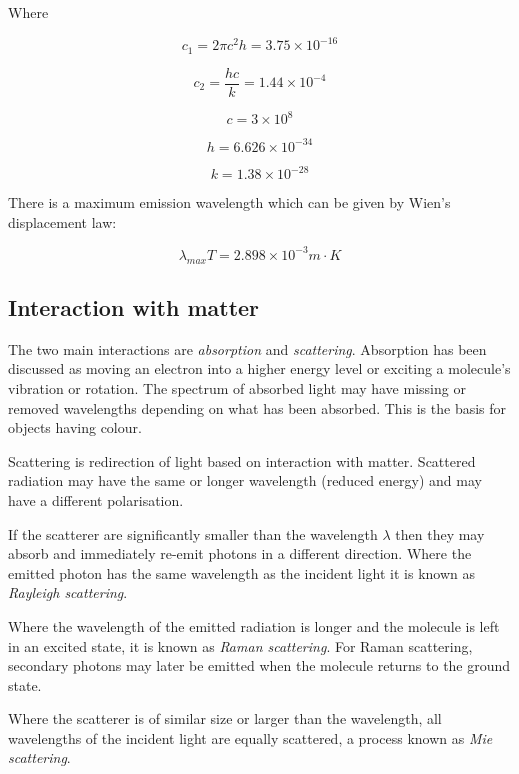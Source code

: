 Where 

\begin{equation}
c_1 = 2\pi c^2 h = 3.75\times10^{-16}
\end{equation}

\begin{equation}
c_2 = \frac{hc}{k} = 1.44\times10^{-4}
\end{equation}

\begin{equation}
c = 3\times10^8
\end{equation}

\begin{equation}
h = 6.626\times10^{-34}
\end{equation}

\begin{equation}
k = 1.38\times10^{-28}
\end{equation}

There is a maximum emission wavelength which can be given by Wien's displacement law:

\begin{equation}
	\lambda_{max}T = 2.898\times10^{-3}m\cdot K
\end{equation}	

\subsection{Interaction with matter}
The two main interactions are {\em absorption} and {\em scattering}. 
Absorption has been discussed as moving an electron into a higher energy level or exciting a molecule's vibration or rotation. The spectrum of absorbed light may have missing or removed wavelengths depending on what has been absorbed. This is the basis for objects having colour.

Scattering is redirection of light based on interaction with matter. Scattered radiation may have the same or longer wavelength (reduced energy) and may have a different polarisation. 

If the scatterer are significantly smaller than the wavelength $\lambda$ then they may absorb and immediately re-emit photons in a different direction. Where the emitted photon has the same wavelength as the incident light it is known as {\em Rayleigh scattering}. 

Where the wavelength of the emitted radiation is longer and the molecule is left in an excited state, it is known as {\em Raman scattering}. For Raman scattering, secondary photons may later be emitted when the molecule returns to the ground state.

Where the scatterer is of similar size or larger than the wavelength, all wavelengths of the incident light are equally scattered, a process known as {\em Mie scattering}. 

